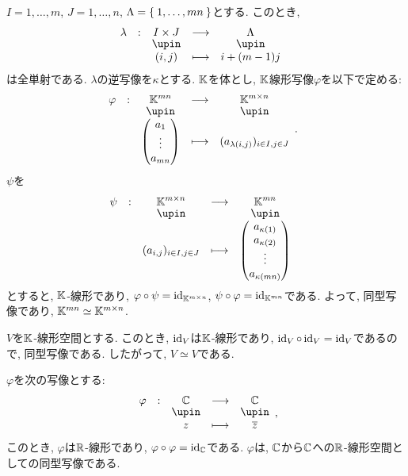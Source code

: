 \begin{example}
  $I={1,\ldots,m}$, $J={1,\ldots,n}$, $\Lambda=\Set{1,\ldots,mn}$とする.
  このとき,
  \begin{align*}
    &\shazo{\lambda}{I\times J}{\Lambda}{(i,j)}{i+(m-1)j}
  \end{align*}
  は全単射である.  $\lambda$の逆写像を$\kappa$とする.
  $\mathbb{K}$を体とし,
  $\mathbb{K}$線形写像$\varphi$を以下で定める:
  \begin{align*}
    &\shazo{\varphi}{\KK^{mn}}{\KK^{m\times n}}{\begin{pmatrix}a_1\\\vdots\\a_{mn}\end{pmatrix}}{(a_{\lambda(i,j)})_{i\in I, j\in J}}.
  \end{align*}
  $\psi$を
  \begin{align*}
    &\shazo{\psi}{\KK^{m\times n}}{\KK^{mn}}
    {(a_{i,j})_{i\in I, j\in J}}{\begin{pmatrix}a_{\kappa(1)}\\a_{\kappa(2)}\\\vdots\\a_{\kappa(mn)}\\\end{pmatrix}}
  \end{align*}
  とすると,
  $\mathbb{K}$-線形であり,
  $\varphi\circ \psi=\operatorname{id}_{\mathbb{K}^{m\times n}}$,
  $\psi\circ\varphi=\operatorname{id}_{\mathbb{K}^{mn}}$である.
  よって, 同型写像であり,
  $\mathbb{K}^{mn}\simeq \mathbb{K}^{m\times n}$.
\end{example}


\begin{example}
  $V$を$\mathbb{K}$-線形空間とする.
  このとき, $\operatorname{id}_{V}$は$\mathbb{K}$-線形であり,
  $\operatorname{id}_{V}\circ\operatorname{id}_{V}=\operatorname{id}_{V}$であるので, 同型写像である.
  したがって, $V\simeq V$である.
\end{example}

\begin{example}
  $\varphi$を次の写像とする:
  \begin{align*}
    \shazo{\varphi}{\CC}{\CC}{z}{\overline{z}},
  \end{align*}
  このとき, $\varphi$は$\mathbb{R}$-線形であり, $\varphi\circ\varphi=\operatorname{id}_{\mathbb{C}}$である.
  $\varphi$は, $\mathbb{C}$から$\mathbb{C}$への$\mathbb{R}$-線形空間としての同型写像である.
\end{example}


